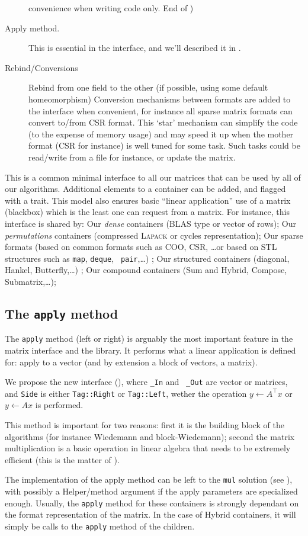 \begin{description}
		convenience when writing code only. End of \danger)
%
	\item[Apply method.]
		This is essential in the \applin interface, and we'll described
		it in .
%
	\item[Rebind/Conversions] Rebind from one field to the other (if
		possible, using some default homeomorphism)
%
	 Conversion mechanisms between formats are added to the interface when
	 convenient, for instance all sparse matrix formats can convert to/from
	 CSR format.  This `star' mechanism can simplify the code (to the
	 expense of memory usage) and may speed it up when the mother format
	 (CSR for instance) is well tuned for some task. Such tasks could be
	 read/write from a file for instance, or update the matrix.
%
\end{description}
%
This is a common minimal interface to all our matrices that can be used by all
of our algorithms. Additional elements to a container can be added, and flagged
with a trait. This model also ensures basic ``linear application'' use of a
matrix (blackbox) which is the least one can request from a matrix.  For
instance, this interface is shared by: Our \emph{dense} containers (BLAS type or
vector of rows); Our  \emph{permutations} containers (compressed \textsc{Lapack} or
cycles representation); Our sparse formats (based on common formats such as
COO, CSR, \ldots or based on STL structures such as {\tt map}, {\tt deque}, {\tt
pair},\ldots) ; Our structured containers (diagonal, Hankel, Butterfly,\ldots) ;
Our compound containers (Sum and Hybrid, Compose, Submatrix,\ldots);
%
\subsection{The \texttt{apply} method}\label{ssec:apply}
%
%
\par
%
The \texttt{apply} method (left or right) is arguably the most important
feature in the matrix interface and the \linbox library. It performs what a
linear application is defined for: apply to a vector (and by extension  a block
of vectors, \ie a matrix).
%
\par
%
We propose the new interface (), where {\tt \_In} and {\tt
\_Out} are vector or matrices, and {\tt Side} is either {\tt Tag::Right} or
{\tt Tag::Left}, wether the operation $y \gets A^{\top} x$ or  $y \gets A x$ is
performed.
%

%
This method is important for two reasons: first it is the building block of the
\applin algorithms (for instance Wiedemann and block-Wiedemann); second the
matrix multiplication is a basic operation in linear algebra that needs to be
extremely efficient (this is the matter of ).
%
\par
%
The implementation of the apply method can be left to the {\tt mul} solution
(see ), with possibly a Helper/method argument if the apply
parameters are specialized enough.
%
%
Usually,  the {\tt apply} method for these
containers is strongly dependant on the format representation of the matrix. In
the case of Hybrid containers, it will simply be calls to the {\tt apply}
method of the children.
%
